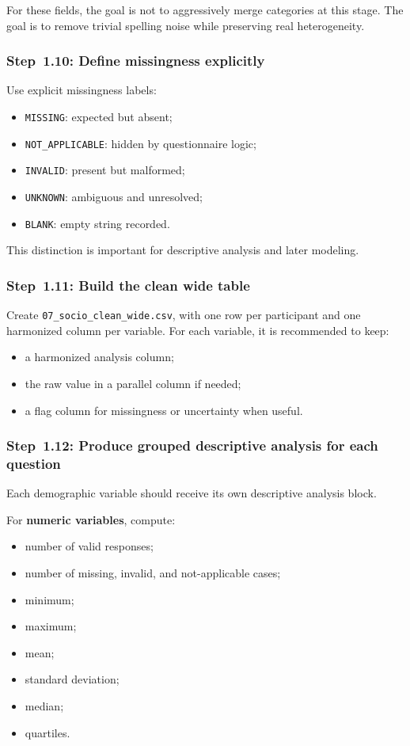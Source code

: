 For these fields, the goal is not to aggressively merge categories at this stage.
The goal is to remove trivial spelling noise while preserving real heterogeneity.

\subsubsection{Step~1.10: Define missingness explicitly}
Use explicit missingness labels:
\begin{itemize}
    \item \texttt{MISSING}: expected but absent;
    \item \texttt{NOT\_APPLICABLE}: hidden by questionnaire logic;
    \item \texttt{INVALID}: present but malformed;
    \item \texttt{UNKNOWN}: ambiguous and unresolved;
    \item \texttt{BLANK}: empty string recorded.
\end{itemize}

This distinction is important for descriptive analysis and later modeling.

\subsubsection{Step~1.11: Build the clean wide table}
Create \texttt{07\_socio\_clean\_wide.csv}, with one row per participant and one harmonized column per variable.
For each variable, it is recommended to keep:
\begin{itemize}
    \item a harmonized analysis column;
    \item the raw value in a parallel column if needed;
    \item a flag column for missingness or uncertainty when useful.
\end{itemize}

\subsubsection{Step~1.12: Produce grouped descriptive analysis for each question}
Each demographic variable should receive its own descriptive analysis block.

For \textbf{numeric variables}, compute:
\begin{itemize}
    \item number of valid responses;
    \item number of missing, invalid, and not-applicable cases;
    \item minimum;
    \item maximum;
    \item mean;
    \item standard deviation;
    \item median;
    \item quartiles.
\end{itemize}

